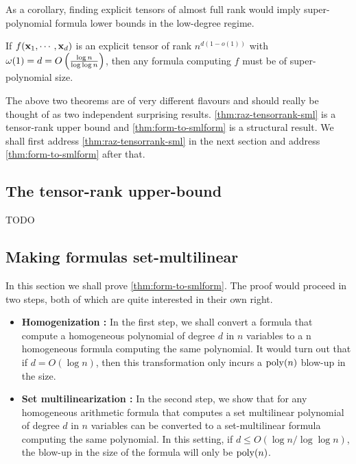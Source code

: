 As a corollary, finding explicit tensors of almost full rank would imply super-polynomial formula lower bounds in the low-degree regime.

\begin{corollary}
  If $f(\mathbf{x}_1,\cdots, \mathbf{x}_d)$ is an explicit tensor of rank $n^{d(1- o(1))}$ with $\omega(1) = d = O\left(\frac{\log n}{\log\log n}\right)$, then any formula computing $f$ must be of super-polynomial size.
\end{corollary}

The above two theorems are of very different flavours and should really be thought of as two independent surprising results.
\autoref{thm:raz-tensorrank-sml} is a tensor-rank upper bound and \autoref{thm:form-to-smlform} is a structural result.
We shall first address \autoref{thm:raz-tensorrank-sml} in the next section and address \autoref{thm:form-to-smlform} after that.

\subsection{The tensor-rank upper-bound}

TODO



\subsection{Making formulas set-multilinear}

In this section we shall prove \autoref{thm:form-to-smlform}.
The proof would proceed in two steps, both of which are quite interested in their own right.
\begin{itemize}
\setlength\itemsep{0em}
\item {\bf Homogenization :} In the first step, we shall convert a
  formula that compute a homogeneous polynomial of degree $d$ in $n$ variables to a n homogeneous formula computing the same polynomial.
It would turn out that if $d = O(\log n)$, then this transformation only incurs a $\operatorname{poly}(n)$ blow-up in the size.
\item {\bf Set multilinearization :} In the second step, we show that
  for any homogeneous arithmetic formula that computes a set multilinear polynomial of degree $d$ in $n$ variables can be converted to a set-multilinear formula computing the same polynomial.
In this setting, if $d \leq O(\log n/\log \log n)$, the blow-up in the size of the formula will only be $\operatorname{poly}(n)$.
\end{itemize}

